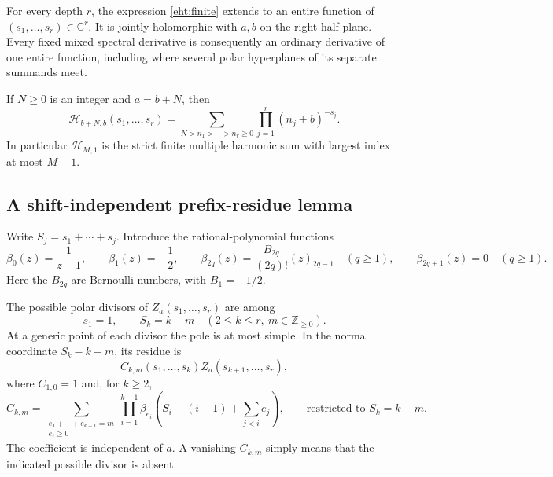 \begin{theorem}\label{eht:main}
For every depth $r$, the expression \eqref{eht:finite} extends to an
entire function of $(s_1,\ldots,s_r)\in\mathbb C^r$.  It is jointly
holomorphic with $a,b$ on the right half-plane.  Every fixed mixed spectral
derivative is consequently an ordinary derivative of one entire function,
including where several polar hyperplanes of its separate summands meet.

If $N\ge0$ is an integer and $a=b+N$, then
\begin{equation}\label{eht:interval}
 \boxed{\mathcal H_{b+N,b}(s_1,\ldots,s_r)=
  \sum_{N>n_1>\cdots>n_r\ge0}
              \prod_{j=1}^r(n_j+b)^{-s_j}.}
\end{equation}
In particular $\mathcal H_{M,1}$ is the strict finite multiple harmonic
sum with largest index at most $M-1$.
\end{theorem}

\subsection{A shift-independent prefix-residue lemma}

Write $S_j=s_1+\cdots+s_j$.  Introduce the rational-polynomial functions
\begin{equation}\label{eht:beta}
 \beta_0(z)=\frac1{z-1},\qquad
 \beta_1(z)=-\frac12,\qquad
 \beta_{2q}(z)=\frac{B_{2q}}{(2q)!}(z)_{2q-1}\quad(q\ge1),
 \qquad \beta_{2q+1}(z)=0\quad(q\ge1).
\end{equation}
Here the $B_{2q}$ are Bernoulli numbers, with $B_1=-1/2$.

\begin{lemma}\label{eht:residue}
The possible polar divisors of $Z_a(s_1,\ldots,s_r)$ are among
\[
 s_1=1,\qquad S_k=k-m\quad(2\le k\le r,\ m\in\mathbb Z_{\ge0}).
\]
At a generic point of each divisor the pole is at most simple.  In the
normal coordinate $S_k-k+m$, its residue is
\begin{equation}\label{eht:resfactor}
 C_{k,m}(s_1,\ldots,s_k)Z_a(s_{k+1},\ldots,s_r),
\end{equation}
where $C_{1,0}=1$ and, for $k\ge2$,
\begin{equation}\label{eht:C}
 C_{k,m}=
 \sum_{\substack{e_1+\cdots+e_{k-1}=m\\e_i\ge0}}
 \prod_{i=1}^{k-1}
 \beta_{e_i}\left(S_i-(i-1)+\sum_{j<i}e_j\right),
 \qquad\text{restricted to }S_k=k-m.
\end{equation}
The coefficient is independent of $a$.  A vanishing $C_{k,m}$ simply means
that the indicated possible divisor is absent.
\end{lemma}


